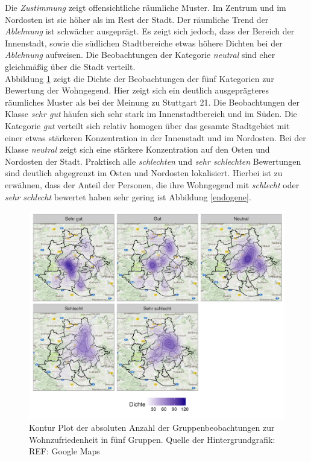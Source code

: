 \documentclass{Vorlage}
\begin{document}
Die \textit{Zustimmung} zeigt offensichtliche räumliche Muster. Im Zentrum und im Nordosten ist sie höher als im Rest der Stadt. Der räumliche Trend der \textit{Ablehnung} ist schwächer ausgeprägt. Es zeigt sich jedoch, dass der Bereich der Innenstadt, sowie die südlichen Stadtbereiche etwas höhere Dichten bei der \textit{Ablehnung} aufweisen. Die Beobachtungen der Kategorie \textit{neutral} sind eher gleichmäßig über die Stadt verteilt.\\
Abbildung \ref{XYWohnG5} zeigt die Dichte der Beobachtungen der fünf Kategorien zur Bewertung der Wohngegend. Hier zeigt sich ein deutlich ausgeprägteres räumliches Muster als bei der Meinung zu Stuttgart 21. Die Beobachtungen der Klasse \textit{sehr gut} häufen sich sehr stark im Innenstadtbereich und im Süden. Die Kategorie \textit{gut} verteilt sich relativ homogen über das gesamte Stadtgebiet mit einer etwas stärkeren Konzentration in der Innenstadt und im Nordosten. Bei der Klasse \textit{neutral} zeigt sich eine stärkere Konzentration auf den Osten und Nordosten der Stadt. Praktisch alle \textit{schlechten} und \textit{sehr schlechten} Bewertungen sind deutlich abgegrenzt im Osten und Nordosten lokalisiert. Hierbei ist zu erwähnen, dass der Anteil der Personen, die ihre Wohngegend mit \textit{schlecht} oder \textit{sehr schlecht} bewertet haben sehr gering ist Abbildung \ref{endogene}.\\

\begin{figure}[h]
 \begin{center}
 \includegraphics[scale=0.8]{Pictures/XYWohnG5.png}
 \caption{Kontur Plot der absoluten Anzahl der Gruppenbeobachtungen zur Wohnzufriedenheit in fünf Gruppen. Quelle der Hintergrundgrafik: REF: Google Maps}
 \label{XYWohnG5}
 \end{center}
\end{figure}
\end{document}
